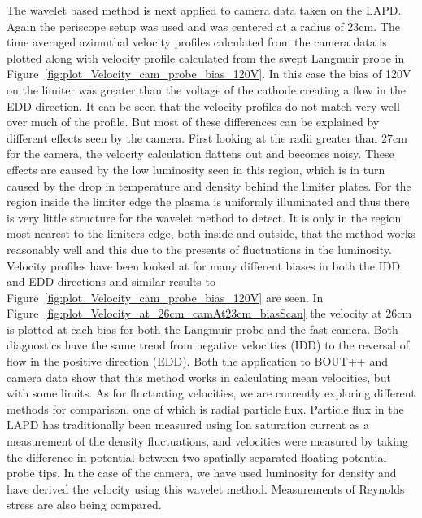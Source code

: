 \documentclass[%
 reprint,
 amsmath,amssymb,
 aps,
]{revtex4-1}
\begin{document}
The wavelet based method is next applied to camera data taken on the LAPD. Again the periscope setup was used and was centered at a radius of 23cm. The time averaged azimuthal velocity profiles calculated from the camera data is plotted along with velocity profile calculated from the swept Langmuir probe in Figure~\ref{fig:plot_Velocity_cam_probe_bias_120V}. In this case the bias of 120V on the limiter was greater than the voltage of the cathode creating a flow in the EDD direction.  It can be seen that the velocity profiles do not match very well over much of the profile.  But most of these differences can be explained by different effects seen by the camera.  First looking at the radii greater than 27cm for the camera, the velocity calculation flattens out and becomes noisy.  These effects are caused by the low luminosity seen in this region, which is in turn caused by the drop in temperature and density behind the limiter plates.  For the region inside the limiter edge the plasma is uniformly illuminated and thus there is very little structure for the wavelet method to detect.  It is only in the region most nearest to the limiters edge, both inside and outside, that the method works reasonably well and this due to the presents of fluctuations in the luminosity.   Velocity profiles have been looked at for many different biases in both the IDD and EDD directions and similar results to Figure~\ref{fig:plot_Velocity_cam_probe_bias_120V} are seen. In Figure~\ref{fig:plot_Velocity_at_26cm_camAt23cm_biasScan} the  velocity at 26cm is plotted at each bias for both the Langmuir probe and the fast camera.  Both diagnostics have the same trend from negative velocities (IDD) to the reversal of flow in the positive direction (EDD). Both the application to BOUT++ and camera data show that this method works in calculating mean velocities, but with some limits.  As for fluctuating velocities, we are currently exploring different methods for comparison, one of which is radial particle flux. Particle flux in the LAPD has traditionally been measured using Ion saturation current as a measurement of the density fluctuations, and velocities were measured by taking the difference in potential between two spatially separated floating potential probe tips. In the case of the camera, we have used luminosity for density and have derived the velocity using this wavelet method.  Measurements of Reynolds stress are also being compared. 
\end{document}
